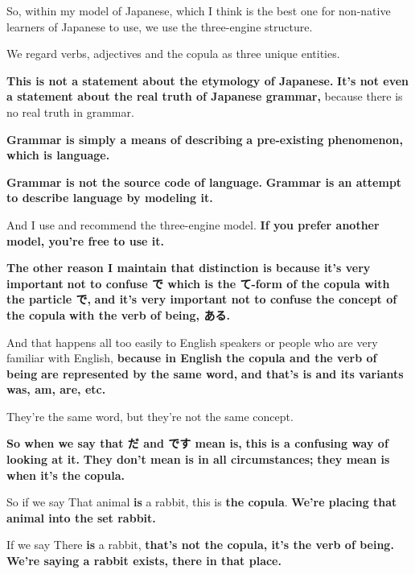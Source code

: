 So, within my model of Japanese, which I think is the best one for non-native learners of Japanese to use, we use the three-engine structure.

We regard verbs, adjectives and the copula as three unique entities.

{}

{\bf This is not a statement about the etymology of Japanese.} {\bf It's not even a statement about the real truth of Japanese grammar,} because there is no real truth in grammar.

{\bf Grammar is simply a means of describing} {\bf a pre-existing phenomenon, which is language.}

{\bf Grammar is not the source code of language.} {\bf Grammar is an attempt to describe language by modeling it.}

And I use and recommend the three-engine model. {\bf If you prefer another model, you're free to use it.}

\thinrule

{\bf The other reason I maintain that distinction is because it's very important} {\bf not to confuse で which is the て-form of the copula with the particle で,} {\bf and it's very important not to confuse the concept of the copula} {\bf with the verb of being, ある.}

{}

And that happens all too easily to English speakers or people who are very familiar with English, {\bf because in English the copula and the verb of being} {\bf are represented by the same word,} {\bf and that's is and its variants was, am, are, etc.}

They're the same word, but they're not the same concept.

\thinrule

{\bf So when we say that だ and です mean is,} {\bf this is a confusing way of looking at it.} {\bf They don't mean is in all circumstances;} {\bf they mean is when it's the copula.}

So if we say That animal {\bf is} a rabbit, this is {\bf the copula}. {\bf We're placing that animal into the set rabbit.}

{}

\thinrule

If we say There {\bf is} a rabbit, {\bf that's not the copula, it's the verb of being.} {\bf We're saying a rabbit exists, there in that place.}

